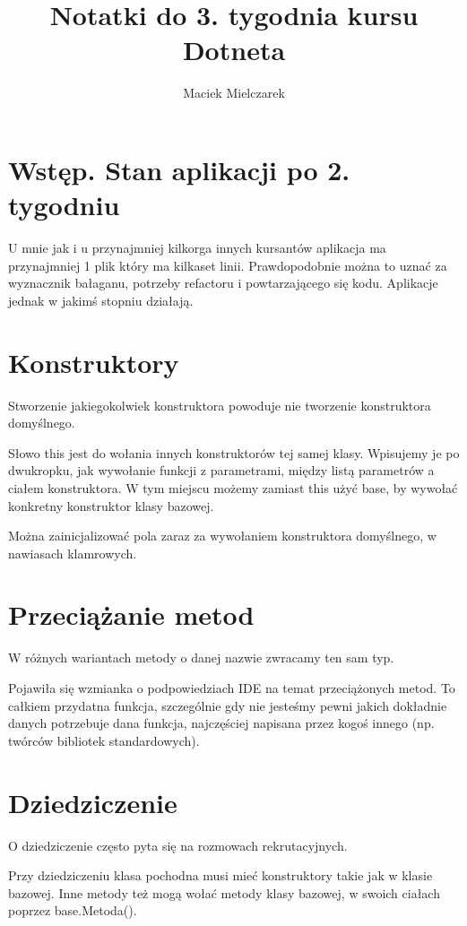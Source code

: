 \documentclass[10pt]{article}
\title{Notatki do 3. tygodnia kursu Dotneta}
\author{Maciek Mielczarek}
\begin{document}
\maketitle

\tableofcontents

\section{Wstęp. Stan aplikacji po 2. tygodniu}
U mnie jak i u przynajmniej kilkorga innych kursantów aplikacja ma przynajmniej 1 plik który ma kilkaset linii. Prawdopodobnie można to uznać za wyznacznik bałaganu, potrzeby refactoru i powtarzającego się kodu. Aplikacje jednak w jakimś stopniu działają.

\section{Konstruktory}
Stworzenie jakiegokolwiek konstruktora powoduje nie tworzenie konstruktora domyślnego.

Słowo this jest do wołania innych konstruktorów tej samej klasy. Wpisujemy je po dwukropku, jak wywołanie funkcji z parametrami, między listą parametrów a ciałem konstruktora. W tym miejscu możemy zamiast this użyć base, by wywołać konkretny konstruktor klasy bazowej.

Można zainicjalizować pola zaraz za wywołaniem konstruktora domyślnego, w nawiasach klamrowych.

\section{Przeciążanie metod}
W różnych wariantach metody o danej nazwie zwracamy ten sam typ.

Pojawiła się wzmianka o podpowiedziach IDE na temat przeciążonych metod. To całkiem przydatna funkcja, szczególnie gdy nie jesteśmy pewni jakich dokładnie danych potrzebuje dana funkcja, najczęściej napisana przez kogoś innego (np. twórców bibliotek standardowych).

\section{Dziedziczenie}
O dziedziczenie często pyta się na rozmowach rekrutacyjnych.

Przy dziedziczeniu klasa pochodna musi mieć konstruktory takie jak w klasie bazowej. Inne metody też mogą wołać metody klasy bazowej, w swoich ciałach poprzez base.Metoda().
\end{document}
